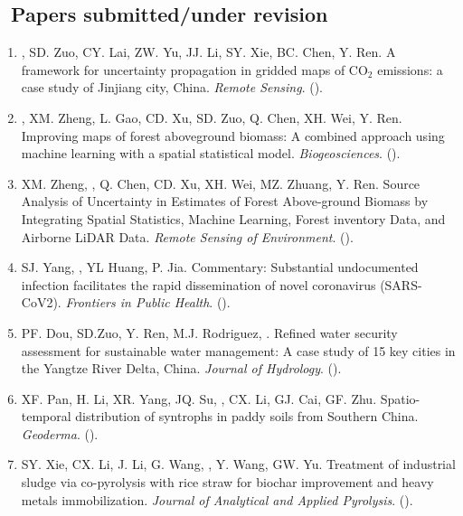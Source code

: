 \subsection*{\texorpdfstring{\faBook\ Papers submitted/under revision}{Papers submitted/under revision}}
\begin{enumerate}
\item
    \Shaoqing, SD. Zuo, CY. Lai, ZW. Yu, JJ. Li, SY. Xie, BC. Chen, Y. Ren.
    A framework for uncertainty propagation in gridded maps of CO$_2$ emissions: a case study of Jinjiang city, China.  
   \textit{Remote Sensing}.
    (\Submitted).
\item
    \Shaoqing\CF, XM. Zheng, L. Gao, CD. Xu, SD. Zuo, Q. Chen, XH. Wei, Y. Ren.
    Improving maps of forest aboveground biomass: A combined approach using machine learning with a spatial statistical model.
    \textit{Biogeosciences}. 
    (\Revision).
\item
    XM. Zheng, \Shaoqing, Q. Chen, CD. Xu, XH. Wei, MZ. Zhuang, Y. Ren.
    Source Analysis of Uncertainty in Estimates of Forest Above-ground Biomass by Integrating Spatial Statistics, Machine Learning, Forest inventory Data, and Airborne LiDAR Data.
    \textit{Remote Sensing of Environment}. 
    (\Submitted).
\item
    SJ. Yang, \Shaoqing, YL Huang, P. Jia.
    Commentary: Substantial undocumented infection facilitates the rapid dissemination of novel coronavirus (SARS-CoV2).
    \textit{Frontiers in Public Health}. 
    (\Review).
\item
    PF. Dou, SD.Zuo, Y. Ren, M.J. Rodriguez, \Shaoqing.
    Refined water security assessment for sustainable water management: A case study of 15 key cities in the Yangtze River Delta, China.
    \textit{Journal of Hydrology}.
    (\Revision).
\item
    XF. Pan, H. Li, XR. Yang, JQ. Su, \Shaoqing, CX. Li, GJ. Cai, GF. Zhu.
    Spatio-temporal distribution of syntrophs in paddy soils from Southern China.
    \textit{Geoderma}.
    (\Submitted).
\item
    SY. Xie, CX. Li, J. Li, G. Wang, \Shaoqing, Y. Wang, GW. Yu.
    Treatment of industrial sludge via co-pyrolysis with rice straw for biochar improvement and heavy metals immobilization.
    \textit{Journal of Analytical and Applied Pyrolysis}. 
    (\Revision).
\end{enumerate}